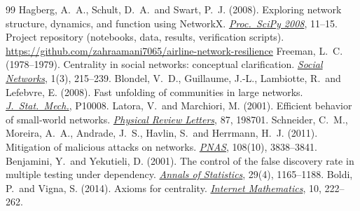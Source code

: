 \documentclass[12pt, a4paper]{article}
\begin{document}
\begin{thebibliography}{99}
 Hagberg, A.\ A., Schult, D.\ A.\ and Swart, P.\ J. (2008). Exploring network structure, dynamics, and function using NetworkX. \href{https://conference.scipy.org/proceedings/SciPy2008/paper_2/}{\emph{Proc.\ SciPy 2008}}, 11--15.
 Project repository (notebooks, data, results, verification scripts). \url{https://github.com/zahraamani7065/airline-network-resilience}
 Freeman, L.\ C. (1978--1979). Centrality in social networks: conceptual clarification. \href{https://doi.org/10.1016/0378-8733(78)90021-7}{\emph{Social Networks}}, 1(3), 215--239.
 Blondel, V.\ D., Guillaume, J.-L., Lambiotte, R.\ and Lefebvre, E. (2008). Fast unfolding of communities in large networks. \href{https://doi.org/10.1088/1742-5468/2008/10/P10008}{\emph{J.\ Stat.\ Mech.}}, P10008.
 Latora, V.\ and Marchiori, M. (2001). Efficient behavior of small-world networks. \href{https://doi.org/10.1103/PhysRevLett.87.198701}{\emph{Physical Review Letters}}, 87, 198701.
 Schneider, C.\ M., Moreira, A.\ A., Andrade, J.\ S., Havlin, S.\ and Herrmann, H.\ J. (2011). Mitigation of malicious attacks on networks. \href{https://doi.org/10.1073/pnas.1009440108}{\emph{PNAS}}, 108(10), 3838--3841.
 Benjamini, Y.\ and Yekutieli, D. (2001). The control of the false discovery rate in multiple testing under dependency. \href{https://doi.org/10.1214/aos/1013699998}{\emph{Annals of Statistics}}, 29(4), 1165--1188.
 Boldi, P.\ and Vigna, S. (2014). Axioms for centrality. \href{https://doi.org/10.1080/15427951.2013.865686}{\emph{Internet Mathematics}}, 10, 222--262.
\end{thebibliography}
\end{document}
